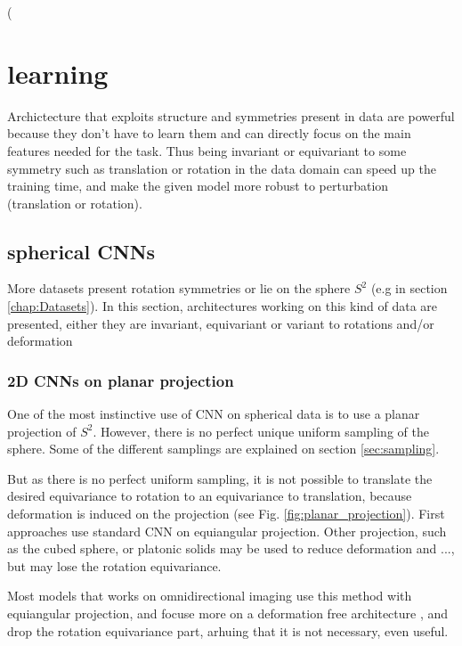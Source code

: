 \documentclass[11pt]{report}
\begin{document}
(

\section{learning}
Archictecture that exploits structure and symmetries present in data are powerful because they don't have to learn them and can directly focus on the main features needed for the task. Thus being invariant or equivariant to some symmetry such as translation or rotation in the data domain can speed up the training time, and make the given model more robust to perturbation (translation or rotation).
\subsection{spherical CNNs}
More datasets present rotation symmetries or lie on the sphere $S^2$ (e.g in section \ref{chap:Datasets}). In this section, architectures working on this kind of data are presented, either they are invariant, equivariant or variant to rotations and/or deformation
\subsubsection{2D CNNs on planar projection}
One of the most instinctive use of CNN on spherical data is to use a planar projection of $S^2$. However, there is no perfect unique uniform sampling of the sphere. Some of the different samplings are explained on section \ref{sec:sampling}.

But as there is no perfect uniform sampling, it is not possible to translate the desired equivariance to rotation to an equivariance to translation, because deformation is induced on the projection (see Fig. \ref{fig:planar_projection}). First approaches use standard CNN on equiangular projection. Other projection, such as the cubed sphere\cite{boomsma_spherical_2017}, or platonic solids\cite{cohen_gauge_2019}\cite{jiang_spherical_2019}\cite{lee_spherephd:_2018} may be used to reduce deformation and ..., but may lose the rotation equivariance.

Most models that works on omnidirectional imaging use this method with equiangular projection, and focuse more on a deformation free architecture \cite{su_learning_2017}\cite{ferrari_spherenet:_2018}, and drop the rotation equivariance part, arhuing that it is not necessary, even useful.
\end{document}

